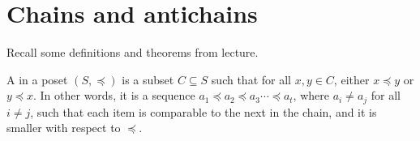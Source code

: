 \documentclass[12pt]{article}
\newcommand{\mfigure}[3]{\bigskip\centerline{\resizebox{#1}{#2}{\texttt{[image: \#3]}}}\bigskip}
\begin{document}

\iftrue
\section*{Chains and antichains}
%
%
%
%

Recall some definitions and theorems from lecture. 

\begin{definition} A  in a poset $(S, \preceq)$ is a subset $C \subseteq S$ such that for all $x, y \in C$, either $x \preceq y$ or $y \preceq x$.
In other words, it is a sequence $a_1 \preceq a_2 \preceq a_3 \cdots \preceq a_t$, where $a_i \neq a_j$ for all $i \neq j$, such that each item is comparable to the next in the chain, and it is smaller with respect to $\preceq$.
\end{definition}
\end{document}
